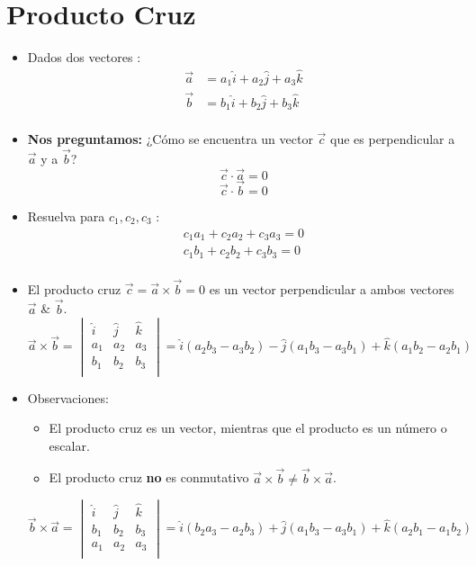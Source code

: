 \section{Producto Cruz}
\begin{itemize}
    \item Dados dos vectores :
        \begin{align*}
            \vec{a} & = a_1 \hat{i}  + a_2 \hat{j} + a_3 \hat{k} \\ 
            \vec{b} & = b_1 \hat{i} + b_2 \hat{j} + b_3 \hat{k} \\ 
        \end{align*}
    
    \item \textbf{Nos preguntamos:} ¿Cómo se encuentra un vector $\vec{c}$  que es perpendicular a $\vec{a}$ y a $\vec{b}$?
        \[
          \vec{c} \cdot \vec{a} = 0 
        \]
        \[
          \vec{c} \cdot \vec{b} = 0 
        \]
    
    \item Resuelva para $c_1,c_2,c_3$ :
        \begin{align*}
            c_1a_1+c_2a_2+c_3a_3=0\\ 
            c_1b_1+c_2b_2+c_3b_3=0\\ 
        \end{align*}
    
    \item El producto cruz $\vec{c}= \vec{a} \times \vec{b} = 0$ es un vector perpendicular a ambos vectores $\vec{a}$ \& $\vec{b}$.
        \begin{equation*}
            \vec{a}\times \vec{b} = \begin{vmatrix}
                \hat{i} & \hat{j} & \hat{k} \\ 
                a_1 & a_2 & a_3 \\ 
                b_1 & b_2 & b_3 \\ 
            \end{vmatrix} = \hat{i}(a_2b_3 - a_3b_2) - \hat{j}(a_1b_3-a_3b_1)+\hat{k}(a_1b_2-a_2b_1) 
        \end{equation*}
    
    \item Observaciones:
        \begin{itemize}
            \item El producto cruz es un vector, mientras que el producto es un número o escalar.
            \item El producto cruz \textbf{no} es conmutativo $\vec{a}\times \vec{b} \neq \vec{b}\times \vec{a}$.
        \end{itemize}
        \begin{equation*}
            \vec{b}\times \vec{a} = \begin{vmatrix}
                \hat{i} & \hat{j} & \hat{k} \\ 
                b_1 & b_2 & b_3 \\ 
                a_1 & a_2 & a_3 \\ 
            \end{vmatrix} = \hat{i}(b_2a_3-a_2b_3)+\hat{j}(a_1b_3-a_3b_1)+\hat{k}(a_2b_1-a_1b_2)
        \end{equation*}
    

\end{itemize}

